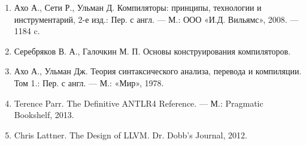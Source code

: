 


\begin{enumerate}
	\item Ахо А., Сети Р., Ульман Д. Компиляторы: принципы, технологии и инструментарий, 2-е изд.: Пер. с англ. — М.: ООО «И.Д. Вильямс», 2008. — 1184 c.
	\item Серебряков В. А., Галочкин М. П. Основы конструирования
	компиляторов.
	\item Ахо А., Ульман Дж. Теория синтаксического анализа, перевода и компиляции. Том 1.: Пер. с англ. — М.: «Мир», 1978.
	\item Terence Parr. The Definitive ANTLR4 Reference. — М.: Pragmatic Bookshelf, 2013.
	\item Chris Lattner. The Design of LLVM. Dr. Dobb’s Journal, 2012.
\end{enumerate}
